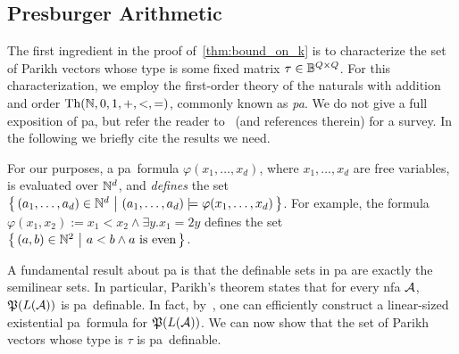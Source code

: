 \subsection*{Presburger Arithmetic}
The first ingredient in the proof of~\cref{thm:bound_on_k} is to characterize the set of Parikh vectors whose type is some fixed matrix $\tau\in \mathbb{B}^{Q\times Q}$. For this characterization, we employ the first-order theory of the naturals with addition and order $\textrm{Th}(\mathbb{N},0,1,+,<,=)$, commonly known as \emph{\gls{pa}}. We do not give a full exposition of \gls{pa}, but refer the reader to~\cite{Haase2018} (and references therein) for a survey. In the following we briefly cite the results we need.

For our purposes, a \gls{pa}~formula $\varphi(x_1,\ldots,x_d)$, where $x_1,\ldots, x_d$ are free variables, is evaluated over $\mathbb{N}^d$, and \emph{defines} the set $\left\{\,(a_1,\ldots,a_d)\in \mathbb{N}^d\ \middle|\ (a_1,\ldots,a_d)\models \varphi(x_1,\ldots,x_d)\,\right\}$. For example, the formula $\varphi(x_1,x_2):=x_1< x_2\wedge \exists y. x_1=2y$ defines the set $\left\{\,(a,b)\in \mathbb{N}^2\ \middle|\ a<b\wedge a \text{ is even}\,\right\}$.

A fundamental result about \gls{pa} is that the definable sets in \gls{pa} are exactly the semilinear sets. In particular, Parikh's theorem states that for every \gls{nfa} $\mathcal{A}$, $\mathfrak{P}(L(\mathcal{A}))$ is \gls{pa}~definable. In fact, by~\cite{Verma2005}, one can efficiently construct a linear-sized existential \gls{pa}~formula for $\mathfrak{P}(L(\mathcal{A}))$.
We can now show that the set of Parikh vectors whose type is $\tau$ is \gls{pa}~definable.


